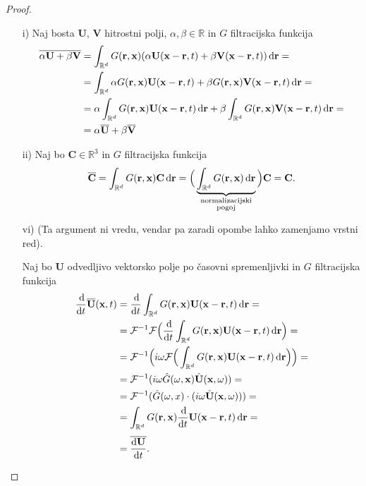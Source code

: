 \documentclass[mat2, tisk]{fmfdelo}
\newcommand{\R}{\mathbb R}
\newcommand{\bd}{\textbf}
\begin{document}
\begin{proof}
\hfill
\begin{enumerate}
  \item[i)] Naj bosta $\bd{U}$, $\bd{V}$ hitrostni polji, $\alpha, \beta \in \R$ in $G$ filtracijska 
  funkcija
  \begin{align*}
  \overline{\alpha \bd{U} + \beta \bd{V}} &= \int_{\R^d} G(\bd{r}, \bd{x}) (\alpha \bd{U}(\bd{x}-\bd{r}, t) + \beta \bd{V}(\bd{x}-\bd{r}, t)) \dif \bd{r} = \\
  &= \int_{\R^d} \alpha G(\bd{r}, \bd{x}) \bd{U}(\bd{x}-\bd{r}, t) + \beta G(\bd{r}, \bd{x}) \bd{V}(\bd{x}-\bd{r}, t) \dif \bd{r} = \\
  &= \alpha\int_{\R^d} G(\bd{r}, \bd{x}) \bd{U}(\bd{x}-\bd{r}, t)\dif \bd{r} + \beta\int_{\R^d}G(\bd{r}, \bd{x}) \bd{V}(\bd{x}-\bd{r}, t) \dif \bd{r} = \\
  &= \alpha \overline{\bd{U}} + \beta\overline{\bd{V}}
  \end{align*}
  \item[ii)] Naj bo $\bd{C}\in \R^3$ in $G$ filtracijska funkcija
  \begin{align*}
  \overline{\bd{C}} = \int_{\R^d} G(\bd{r}, \bd{x}) \bd{C} \dif \bd{r} = \Big(\underbrace{\int_{\R^d} G(\bd{r}, \bd{x})\dif \bd{r}}_{\substack{\text{normalizacijski}\\\text{pogoj}}}\Big) \bd{C} = \bd{C}.
  \end{align*}
  \item[vi)] (Ta argument ni vredu, vendar pa zaradi opombe lahko zamenjamo vrstni red).
  
  Naj bo $\bd{U}$ odvedljivo vektorsko polje po časovni spremenljivki in $G$ filtracijska funkcija 
  \begin{align*}
  \frac{\dif}{\dif t} \overline{\bd{U}}(\bd{x}, t) &= \frac{\dif}{\dif t} \int_{\R^d} G(\bd{r}, \bd{x}) \bd{U}(\bd{x}-\bd{r}, t) \dif \bd{r} = \\
  &= \mathcal{F}^{-1}\mathcal{F}\Big(\frac{\dif}{\dif t} \int_{\R^d} G(\bd{r}, \bd{x}) \bd{U}(\bd{x}-\bd{r}, t) \dif \bd{r}\Big)= \\
  &= \mathcal{F}^{-1}\Big(i\omega \mathcal{F}\Big(\int_{\R^d} G(\bd{r}, \bd{x}) \bd{U}(\bd{x}-\bd{r}, t) \dif \bd{r} \Big)\Big)= \\
  &= \mathcal{F}^{-1}(i\omega \hat{G}(\omega, \bd{x})\hat{\bd{U}}(\bd{x}, \omega)) = \\
  &= \mathcal{F}^{-1}(\hat{G}(\omega, x) \cdot(i\omega \hat{\bd{U}}(\bd{x}, \omega))) = \\
  &= \int_{\R^d} G(\bd{r}, \bd{x}) \frac{\dif}{\dif t} \bd{U}(\bd{x}-\bd{r}, t) \dif \bd{r} =\\[1mm]
  &= \overline{\frac{\dif \bd{U}}{\dif t}}.
  \end{align*}


\end{enumerate}
\end{proof}
\end{document}

